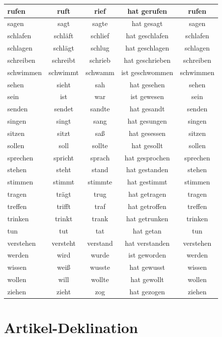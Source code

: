 \begin{center}
\begin{tabular}{|l|c|c|c|c|}
rufen & ruft & rief & hat gerufen & rufen \\ \hline
sagen & sagt & sagte & hat gesagt & sagen \\ \hline
schlafen & schläft & schlief & hat geschlafen & schlafen \\ \hline
schlagen & schlägt & schlug & hat geschlagen & schlagen \\ \hline
schreiben & schreibt & schrieb & hat geschrieben & schreiben \\ \hline
schwimmen & schwimmt & schwamm & ist geschwommen & schwimmen \\ \hline
sehen & sieht & sah & hat gesehen & sehen \\ \hline
sein & ist & war & ist gewesen & sein \\ \hline
senden & sendet & sandte & hat gesandt & senden \\ \hline
singen & singt & sang & hat gesungen & singen \\ \hline
sitzen & sitzt & saß & hat gesessen & sitzen \\ \hline
sollen & soll & sollte & hat gesollt & sollen \\ \hline
sprechen & spricht & sprach & hat gesprochen & sprechen \\ \hline
stehen & steht & stand & hat gestanden & stehen \\ \hline
stimmen & stimmt & stimmte & hat gestimmt & stimmen \\ \hline
tragen & trägt & trug & hat getragen & tragen \\ \hline
treffen & trifft & traf & hat getroffen & treffen \\ \hline
trinken & trinkt & trank & hat getrunken & trinken \\ \hline
tun & tut & tat & hat getan & tun \\ \hline
verstehen & versteht & verstand & hat verstanden & verstehen \\ \hline
werden & wird & wurde & ist geworden & werden \\ \hline
wissen & weiß & wusste & hat gewusst & wissen \\ \hline
wollen & will & wollte & hat gewollt & wollen \\ \hline
ziehen & zieht & zog & hat gezogen & ziehen \\ \hline
\end{tabular}
\end{center}

\section{Artikel-Deklination}
\label{sec:ArtikelDeklination}

